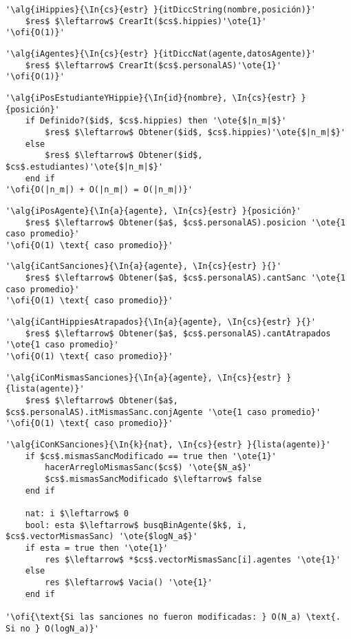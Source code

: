 \begin{lstlisting}[mathescape]
'\alg{iHippies}{\In{cs}{estr} }{itDiccString(nombre,posición)}'
	$res$ $\leftarrow$ CrearIt($cs$.hippies)'\ote{1}'
'\ofi{O(1)}'
\end{lstlisting}

\begin{lstlisting}[mathescape]
'\alg{iAgentes}{\In{cs}{estr} }{itDiccNat(agente,datosAgente)}'
	$res$ $\leftarrow$ CrearIt($cs$.personalAS)'\ote{1}'
'\ofi{O(1)}'
\end{lstlisting}

\begin{lstlisting}[mathescape]
'\alg{iPosEstudianteYHippie}{\In{id}{nombre}, \In{cs}{estr} }{posición}'
	if Definido?($id$, $cs$.hippies) then '\ote{$|n_m|$}'
		$res$ $\leftarrow$ Obtener($id$, $cs$.hippies)'\ote{$|n_m|$}'
	else
		$res$ $\leftarrow$ Obtener($id$, $cs$.estudiantes)'\ote{$|n_m|$}'
	end if
'\ofi{O(|n_m|) + O(|n_m|) = O(|n_m|)}'
\end{lstlisting}

\begin{lstlisting}[mathescape]
'\alg{iPosAgente}{\In{a}{agente}, \In{cs}{estr} }{posición}'
	$res$ $\leftarrow$ Obtener($a$, $cs$.personalAS).posicion '\ote{1 caso promedio}'
'\ofi{O(1) \text{ caso promedio}}'
\end{lstlisting}

\begin{lstlisting}[mathescape]
'\alg{iCantSanciones}{\In{a}{agente}, \In{cs}{estr} }{}'
	$res$ $\leftarrow$ Obtener($a$, $cs$.personalAS).cantSanc '\ote{1 caso promedio}'
'\ofi{O(1) \text{ caso promedio}}'
\end{lstlisting}

\begin{lstlisting}[mathescape]
'\alg{iCantHippiesAtrapados}{\In{a}{agente}, \In{cs}{estr} }{}'
	$res$ $\leftarrow$ Obtener($a$, $cs$.personalAS).cantAtrapados '\ote{1 caso promedio}'
'\ofi{O(1) \text{ caso promedio}}'
\end{lstlisting}

\begin{lstlisting}[mathescape]
'\alg{iConMismasSanciones}{\In{a}{agente}, \In{cs}{estr} }{lista(agente)}'
	$res$ $\leftarrow$ Obtener($a$, $cs$.personalAS).itMismasSanc.conjAgente '\ote{1 caso promedio}'
'\ofi{O(1) \text{ caso promedio}}'
\end{lstlisting}

\begin{lstlisting}[mathescape]
'\alg{iConKSanciones}{\In{k}{nat}, \In{cs}{estr} }{lista(agente)}'
	if $cs$.mismasSancModificado == true then '\ote{1}'
		hacerArregloMismasSanc($cs$) '\ote{$N_a$}'
		$cs$.mismasSancModificado $\leftarrow$ false
	end if
	
	nat: i $\leftarrow$ 0
	bool: esta $\leftarrow$ busqBinAgente($k$, i, $cs$.vectorMismasSanc) '\ote{$logN_a$}'
	if esta = true then '\ote{1}'
		res $\leftarrow$ *$cs$.vectorMismasSanc[i].agentes '\ote{1}'
	else
		res $\leftarrow$ Vacia() '\ote{1}'
	end if

'\ofi{\text{Si las sanciones no fueron modificadas: } O(N_a) \text{. Si no } O(logN_a)}'
\end{lstlisting}

